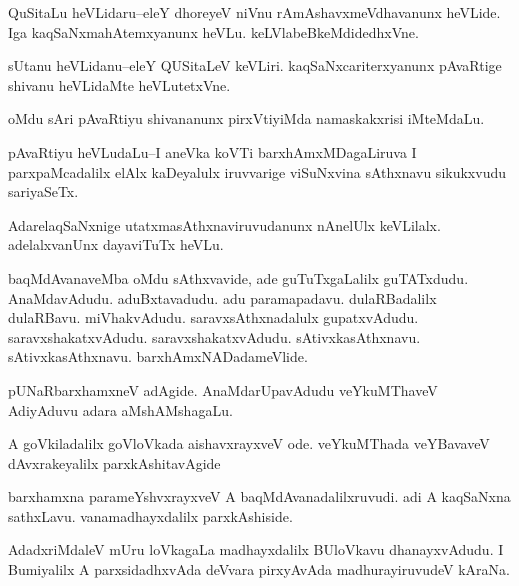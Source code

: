 \documentclass{article}
\begin{document}
\begin{mn}%
QuSitaLu heVLidaru--eleY dhoreyeV niVnu rAmAshavxmeVdhavanunx heVLide. Iga 
kaqSaNxmahAtemxyanunx heVLu. keLVlabeBkeMdidedhxVne.
\end{mn}

\begin{mn}%
sUtanu heVLidanu--eleY QUSitaLeV keVLiri. kaqSaNxcariterxyanunx pAvaRtige shivanu heVLidaMte
heVLutetxVne.
\end{mn}

\begin{mn}%
oMdu sAri pAvaRtiyu shivananunx pirxVtiyiMda namaskakxrisi iMteMdaLu.
\end{mn}

\begin{mn}%
pAvaRtiyu heVLudaLu--I aneVka koVTi barxhAmxMDagaLiruva I parxpaMcadalilx elAlx kaDeyalulx
iruvvarige viSuNxvina sAthxnavu sikukxvudu sariyaSeTx.
\end{mn}

\begin{mn}%
AdarelaqSaNxnige utatxmasAthxnaviruvudanunx nAnelUlx keVLilalx. adelalxvanUnx dayaviTuTx 
heVLu.
\end{mn}

\begin{mn}%
baqMdAvanaveMba oMdu sAthxvavide, ade guTuTxgaLalilx guTATxdudu. AnaMdavAdudu. 
aduBxtavadudu. adu paramapadavu. dulaRBadalilx  dulaRBavu. miVhakvAdudu. 
saravxsAthxnadalulx gupatxvAdudu. saravxshakatxvAdudu. saravxshakatxvAdudu. 
sAtivxkasAthxnavu. sAtivxkasAthxnavu. barxhAmxNADadameVlide.
\end{mn}

\begin{mn}%
pUNaRbarxhamxneV adAgide. AnaMdarUpavAdudu veYkuMThaveV AdiyAduvu adara aMshAMshagaLu.
\end{mn}

\begin{mn}%
A goVkiladalilx goVloVkada aishavxrayxveV ode. veYkuMThada veYBavaveV dAvxrakeyalilx 
parxkAshitavAgide
\end{mn}

\begin{mn}%
barxhamxna parameYshvxrayxveV A baqMdAvanadalilxruvudi. adi A  kaqSaNxna sathxLavu. 
vanamadhayxdalilx parxkAshiside.
\end{mn}

\begin{mn}%
AdadxriMdaleV mUru loVkagaLa madhayxdalilx BUloVkavu dhanayxvAdudu. I  Bumiyalilx A 
parxsidadhxvAda deVvara pirxyAvAda madhurayiruvudeV kAraNa.
\end{mn}
\end{document}
